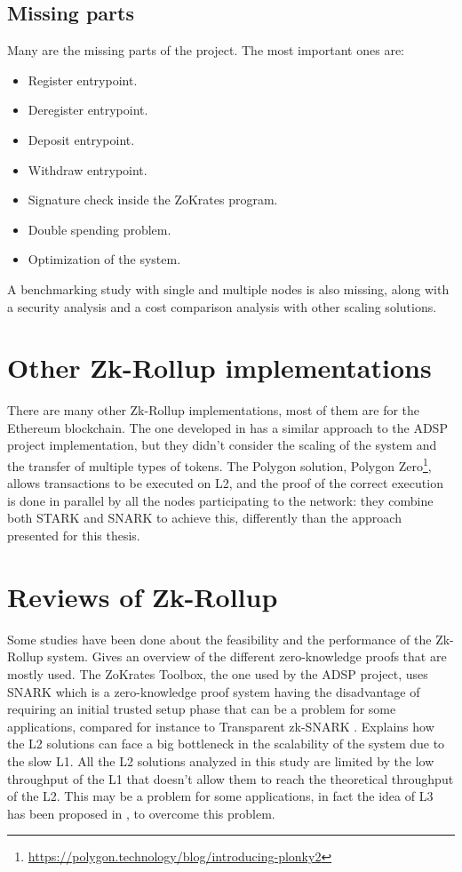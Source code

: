 \subsection{Missing parts \label{subsec:missingParts}}
Many are the missing parts of the project. The most important ones are:
\begin{itemize}
  \item Register entrypoint.
  \item Deregister entrypoint.
  \item Deposit entrypoint.
  \item Withdraw entrypoint.
  \item Signature check inside the ZoKrates program.
  \item Double spending problem.
  \item Optimization of the system.
\end{itemize}
A benchmarking study with single and multiple nodes is also missing, along with a security analysis and a cost comparison analysis with other scaling solutions.

\section{Other Zk-Rollup implementations}
There are many other Zk-Rollup implementations, most of them are for the Ethereum blockchain. The one developed in \cite{dinh_implementation_2023} has a similar approach to the ADSP project implementation, but they didn't consider the scaling of the system and the transfer of multiple types of tokens. The Polygon solution, Polygon Zero\footnote{\url{https://polygon.technology/blog/introducing-plonky2}}, allows transactions to be executed on L2, and the proof of the correct execution is done in parallel by all the nodes participating to the network: they combine both STARK and SNARK to achieve this, differently than the approach presented for this thesis.

\section{Reviews of Zk-Rollup}
Some studies have been done about the feasibility and the performance of the Zk-Rollup system. \cite{capko_state_2022} Gives an overview of the different zero-knowledge proofs that are mostly used. The ZoKrates Toolbox, the one used by the ADSP project, uses SNARK which is a zero-knowledge proof system having the disadvantage of requiring an initial trusted setup phase that can be a problem for some applications, compared for instance to Transparent zk-SNARK \cite{zhou_overview_2022}. \cite{neiheiser_practical_2023} Explains how the L2 solutions can face a big bottleneck in the scalability of the system due to the slow L1. All the L2 solutions analyzed in this study are limited by the low throughput of the L1 that doesn't allow them to reach the theoretical throughput of the L2. This may be a problem for some applications, in fact the idea of L3 has been proposed in \cite{starkware_fractal_2021}, to overcome this problem.

